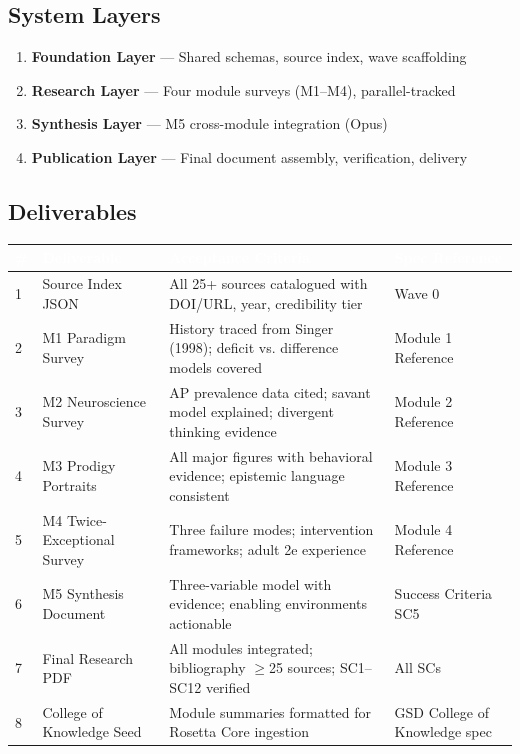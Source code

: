 \documentclass[11pt,letterpaper]{article}
\newcommand{\tableheader}[1]{\textbf{\sffamily\textcolor{white}{#1}}}
\begin{document}
\subsection{System Layers}

\begin{enumerate}[leftmargin=*]
  \item \textbf{Foundation Layer} --- Shared schemas, source index, wave scaffolding
  \item \textbf{Research Layer} --- Four module surveys (M1--M4), parallel-tracked
  \item \textbf{Synthesis Layer} --- M5 cross-module integration (Opus)
  \item \textbf{Publication Layer} --- Final document assembly, verification, delivery
\end{enumerate}

\subsection{Deliverables}

\begin{center}
\begin{tabularx}{\textwidth}{C{0.5cm}L{3.5cm}L{4cm}X}
\toprule
{}
\tableheader{\#} & \tableheader{Deliverable} & \tableheader{Acceptance Criteria} & \tableheader{Spec Reference} \\
 & Source Index JSON & All 25+ sources catalogued with DOI/URL, year, credibility tier & Wave 0 \\
2 & M1 Paradigm Survey & History traced from Singer (1998); deficit vs. difference models covered & Module 1 Reference \\
3 & M2 Neuroscience Survey & AP prevalence data cited; savant model explained; divergent thinking evidence & Module 2 Reference \\
4 & M3 Prodigy Portraits & All major figures with behavioral evidence; epistemic language consistent & Module 3 Reference \\
5 & M4 Twice-Exceptional Survey & Three failure modes; intervention frameworks; adult 2e experience & Module 4 Reference \\
6 & M5 Synthesis Document & Three-variable model with evidence; enabling environments actionable & Success Criteria SC5 \\
7 & Final Research PDF & All modules integrated; bibliography $\geq$25 sources; SC1--SC12 verified & All SCs \\
8 & College of Knowledge Seed & Module summaries formatted for Rosetta Core ingestion & GSD College of Knowledge spec \\
\bottomrule
\end{tabularx}
\end{center}
\end{document}
